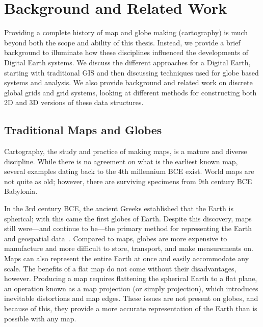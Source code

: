 \chapter{Background and Related Work} \label{chap:background}
Providing a complete history of map and globe making (cartography) is much beyond both the scope and ability of this thesis.
Instead, we provide a brief background to illuminate how these disciplines influenced the developments of Digital Earth systems.
We discuss the different approaches for a Digital Earth, starting with traditional GIS and then discussing techniques used for globe based systems and analysis.
We also provide background and related work on discrete global grids and grid systems, looking at different methods for constructing both 2D and 3D versions of these data structures.


\section{Traditional Maps and Globes}
Cartography, the study and practice of making maps, is a mature and diverse discipline.
While there is no agreement on what is the earliest known map, several examples dating back to the 4th millennium BCE exist.
World maps are not quite as old; however, there are surviving specimens from 9th century BCE Babylonia.


In the 3rd century BCE, the ancient Greeks established that the Earth is spherical; with this came the first globes of Earth.
Despite this discovery, maps still were---and continue to be---the primary method for representing the Earth and geospatial data~\cite{hruby20182000}.
Compared to maps, globes are more expensive to manufacture and more difficult to store, transport, and make measurements on.
Maps can also represent the entire Earth at once and easily accommodate any scale.
The benefits of a flat map do not come without their disadvantages, however.
Producing a map requires flattening the spherical Earth to a flat plane, an operation known as a map projection (or simply projection), which introduces inevitable distortions and map edges.
These issues are not present on globes, and because of this, they provide a more accurate representation of the Earth than is possible with any map.


